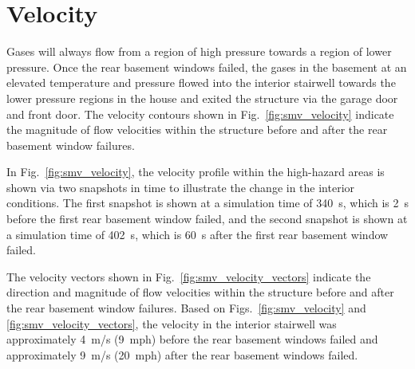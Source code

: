 \documentclass[12pt,oneside]{book}
\begin{document}
\clearpage


\section{Velocity}
\label{sec:velocity}

Gases will always flow from a region of high pressure towards a region of lower pressure. Once the rear basement windows failed, the gases in the basement at an elevated temperature and pressure flowed into the interior stairwell towards the lower pressure regions in the house and exited the structure via the garage door and front door. The velocity contours shown in Fig.~\ref{fig:smv_velocity} indicate the magnitude of flow velocities within the structure before and after the rear basement window failures.

In Fig.~\ref{fig:smv_velocity}, the velocity profile within the high-hazard areas is shown via two snapshots in time to illustrate the change in the interior conditions. The first snapshot is shown at a simulation time of 340~s, which is 2~s before the first rear basement window failed, and the second snapshot is shown at a simulation time of 402~s, which is 60~s after the first rear basement window failed.

The velocity vectors shown in Fig.~\ref{fig:smv_velocity_vectors} indicate the direction and magnitude of flow velocities within the structure before and after the rear basement window failures. Based on Figs.~\ref{fig:smv_velocity} and \ref{fig:smv_velocity_vectors}, the velocity in the interior stairwell was approximately 4~m/s (9~mph) before the rear basement windows failed and approximately 9~m/s (20~mph) after the rear basement windows failed.
\end{document}
